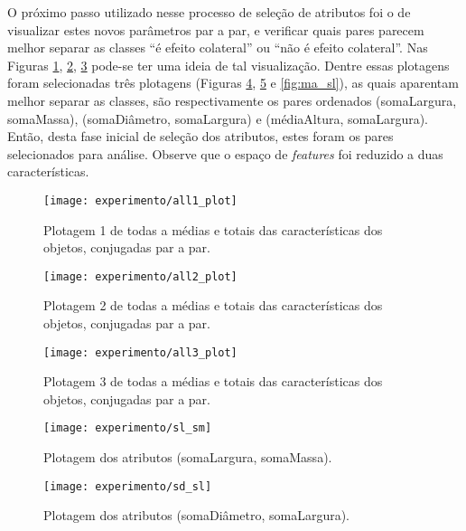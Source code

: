 O próximo passo utilizado nesse processo de seleção de atributos foi o de visualizar estes novos parâmetros par a par, e verificar quais pares parecem melhor separar as classes ``é efeito colateral'' ou ``não é efeito colateral''. Nas Figuras \ref{fig:plotall1}, \ref{fig:plotall2}, \ref{fig:plotall3} pode-se ter uma ideia de tal visualização. Dentre essas plotagens foram selecionadas três plotagens (Figuras \ref{fig:sl_sm}, \ref{fig:sd_sl} e \ref{fig:ma_sl}), as quais aparentam melhor separar as classes, são respectivamente os pares ordenados (somaLargura, somaMassa), (somaDiâmetro, somaLargura) e (médiaAltura, somaLargura). Então, desta fase inicial de seleção dos atributos, estes foram os pares selecionados para análise. Observe que o espaço de \textit{features} foi reduzido a duas características.

\begin{figure}[!htb] \centering 
  \centering
  \texttt{[image: experimento/all1\_plot]} 
  \caption{Plotagem 1 de todas a médias e totais das características dos objetos, conjugadas par a par.} 
  \label{fig:plotall1}
\end{figure}

\begin{figure}[!htb] \centering 
  \centering
  \texttt{[image: experimento/all2\_plot]} 
  \caption{Plotagem 2 de todas a médias e totais das características dos objetos, conjugadas par a par.} 
  \label{fig:plotall2}
\end{figure}

\begin{figure}[!htb] \centering 
  \centering
  \texttt{[image: experimento/all3\_plot]} 
  \caption{Plotagem 3 de todas a médias e totais das características dos objetos, conjugadas par a par.} 
  \label{fig:plotall3}
\end{figure}

\begin{figure}[!htb] \centering 
  \centering
  \texttt{[image: experimento/sl\_sm]} 
  \caption{Plotagem dos atributos (somaLargura, somaMassa). } 
  \label{fig:sl_sm}
\end{figure}

\begin{figure}[!htb] \centering 
  \centering
  \texttt{[image: experimento/sd\_sl]} 
  \caption{Plotagem dos atributos (somaDiâmetro, somaLargura). } 
  \label{fig:sd_sl}
\end{figure}

